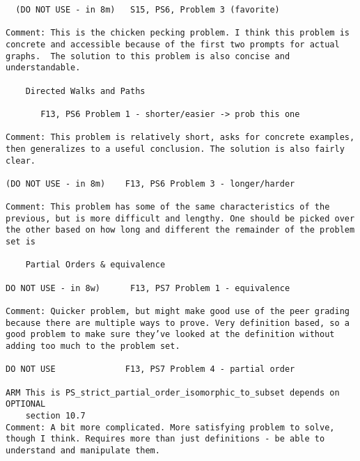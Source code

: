 \documentclass[handout]{mcs}
\begin{document}
\begin{staffnotes}
\begin{verbatim}
  (DO NOT USE - in 8m)   S15, PS6, Problem 3 (favorite)

Comment: This is the chicken pecking problem. I think this problem is
concrete and accessible because of the first two prompts for actual
graphs.  The solution to this problem is also concise and
understandable.

    Directed Walks and Paths

       F13, PS6 Problem 1 - shorter/easier -> prob this one

Comment: This problem is relatively short, asks for concrete examples,
then generalizes to a useful conclusion. The solution is also fairly
clear.

(DO NOT USE - in 8m)    F13, PS6 Problem 3 - longer/harder

Comment: This problem has some of the same characteristics of the
previous, but is more difficult and lengthy. One should be picked over
the other based on how long and different the remainder of the problem
set is

    Partial Orders & equivalence

DO NOT USE - in 8w)      F13, PS7 Problem 1 - equivalence

Comment: Quicker problem, but might make good use of the peer grading
because there are multiple ways to prove. Very definition based, so a
good problem to make sure they’ve looked at the definition without
adding too much to the problem set.

DO NOT USE              F13, PS7 Problem 4 - partial order

ARM This is PS_strict_partial_order_isomorphic_to_subset depends on OPTIONAL
    section 10.7
Comment: A bit more complicated. More satisfying problem to solve,
though I think. Requires more than just definitions - be able to
understand and manipulate them.
\end{verbatim}
\end{staffnotes}






\end{document}
